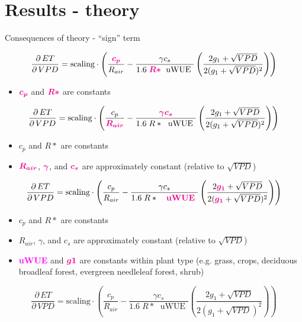 \documentclass[aspectratio=169]{beamer}
\begin{document}
\section{Results - theory}
\begin{frame}{Consequences of theory - ``sign'' term}
  \begin{overprint}
    \[\frac{\partial \, ET}{\partial \, VPD} = \text{scaling} \cdot \left(\frac{\textcolor{magenta}{\boldsymbol{ c_p}}}{R_{air}} - \frac{\gamma c_s }{1.6 \; \textcolor{magenta}{\boldsymbol{R*}}\; \text{ uWUE }} \left( \frac{2 g_1 + \sqrt{VPD}}{2 (g_1 + \sqrt{VPD})^2}\right) \right)\]
    \begin{itemize}
    \item $\textcolor{magenta}{\boldsymbol{c_p}}$ and $\textcolor{magenta}{\boldsymbol{R*}}$ are constants
    \end{itemize}
    \[\frac{\partial \, ET}{\partial \, VPD} = \text{scaling} \cdot \left(\frac{ c_p}{\textcolor{magenta}{\boldsymbol{R_{air}}}} - \frac{\textcolor{magenta}{\boldsymbol{\gamma c_s}} }{1.6 \; R*\; \text{ uWUE }} \left( \frac{2 g_1 + \sqrt{VPD}}{2 (g_1 + \sqrt{VPD})^2}\right) \right)\]
    \begin{itemize}
    \item $c_p$ and $R*$ are constants
    \item $\textcolor{magenta}{\boldsymbol{R_{air}}}$, $\textcolor{magenta}{\boldsymbol{\gamma}}$, and $\textcolor{magenta}{\boldsymbol{c_s}}$ are approximately constant (relative to $\sqrt{VPD}$)
    \end{itemize}
    \[\frac{\partial \, ET}{\partial \, VPD} = \text{scaling} \cdot \left(\frac{ c_p}{R_{air}} - \frac{\gamma c_s }{1.6 \; R*\; \text{ \textcolor{magenta}{\textbf{ uWUE}} }} \left( \frac{2  \textcolor{magenta}{\boldsymbol{g_1}} + \sqrt{VPD}}{2 ( \textcolor{magenta}{\boldsymbol{g_1}} + \sqrt{VPD})^2}\right) \right)\]

    \begin{itemize}
    \item $c_p$ and $R*$ are constants
    \item $R_{air}$, $\gamma$, and $c_s$ are approximately constant (relative to $\sqrt{VPD}$)
    \item \textcolor{magenta}{\textbf{uWUE}} and $\textcolor{magenta}{\boldsymbol{g1}}$ are constants within plant type (e.g. grass, crops, deciduous broadleaf forest, evergreen needleleaf forest, shrub)
    \end{itemize}
    \[\frac{\partial \, ET}{\partial \, VPD} = \text{scaling} \cdot \left(\frac{ c_p}{R_{air}} - \frac{\gamma c_s }{1.6 \; R*\; \text{ uWUE }} \left( \frac{2 g_1 + \sqrt{VPD}}{2 (g_1 + \sqrt{VPD})^2}\right) \right)\]


\end{overprint}
\end{frame}
\end{document}
